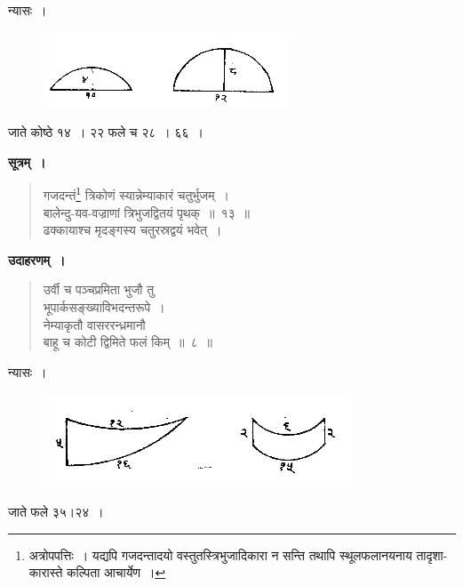 \documentclass[11pt, openany]{book}
\begin{document}
 न्यासः~। 
 \vspace{-4mm}
 
\begin{figure}[h!]
    \centering
    \includegraphics[scale=0.8]{graphics/capture7.png}
\captionsetup{labelformat=empty}
\end{figure}
 \vspace{-4mm}

जाते कोष्ठे १४~। २२ फले च २८~। ६६~।

\newpage%
\setcounter{footnote}{0}
 \textbf{सूत्रम्~।} 
\begin{quote}
    \bs 
    गजदन्तं\footnote{अत्रोपपत्तिः~। यद्यपि गजदन्तादयो वस्तुतस्त्रिभुजादिकारा
न सन्ति तथापि स्थूलफलानयनाय तादृशा-कारास्ते कल्पिता
आचार्येण~।} त्रिकोणं स्यान्नेम्याकारं चतुर्भुजम्~।\\
बालेन्दु-यव-वज्राणां त्रिभुजद्वितयं पृथक्~॥~१३~॥\\
ढक्कायाश्च मृदङ्गस्य चतुरस्रद्वयं भवेत्~। 
\end{quote}

 \textbf{उदाहरणम्~।} 
\begin{quote}
    \bqt 
     उर्वी च पञ्चप्रमिता भुजौ तु \\
     भूपार्कसङ्ख्याविभदन्तरूपे~।\\
नेम्याकृतौ वासररन्ध्रमानौ \\
बाहू च कोटी द्विमिते फलं किम्~॥~८~॥
\end{quote}

 न्यासः~। 
 \vspace{-4mm}

\begin{figure}[h!]
    \centering
    \includegraphics[scale=0.8]{graphics/capture8.png}
\captionsetup{labelformat=empty}
\end{figure}
 \vspace{-4mm}

जाते फले ३५।२४~।
\end{document}
